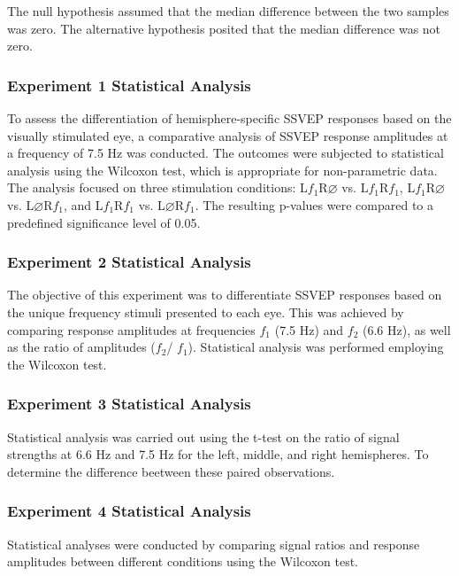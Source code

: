 The null hypothesis assumed that the median difference between the two samples was zero. The alternative hypothesis posited that the median difference was not zero.

\subsubsection{Experiment 1 Statistical Analysis}

To assess the differentiation of hemisphere-specific SSVEP responses based on the visually stimulated eye, a comparative analysis of SSVEP response amplitudes at a frequency of 7.5 Hz was conducted. The outcomes were subjected to statistical analysis using the Wilcoxon test, which is appropriate for non-parametric data. The analysis focused on three stimulation conditions: L$f_{1}$R$\varnothing$ vs. L$f_{1}$R$f_{1}$, L$f_{1}$R$\varnothing$ vs. L$\varnothing$R$f_{1}$, and L$f_{1}$R$f_{1}$ vs. L$\varnothing$R$f_{1}$. The resulting p-values were compared to a predefined significance level of 0.05. 

\subsubsection{Experiment 2 Statistical Analysis}

The objective of this experiment was to differentiate SSVEP responses based on the unique frequency stimuli presented to each eye. This was achieved by comparing response amplitudes at frequencies $f_{1}$ (7.5 Hz) and $f_{2}$ (6.6 Hz), as well as the ratio of amplitudes ($f_{2}$/ $f_{1}$). Statistical analysis was performed employing the Wilcoxon test.

\subsubsection{Experiment 3 Statistical Analysis}
Statistical analysis was carried out using the t-test on the ratio of signal strengths at 6.6 Hz and 7.5 Hz for the left, middle, and right hemispheres. To determine the difference beetween these paired observations.

\subsubsection{Experiment 4 Statistical Analysis}

Statistical analyses were conducted by comparing signal ratios and response amplitudes between different conditions using the Wilcoxon test. 

